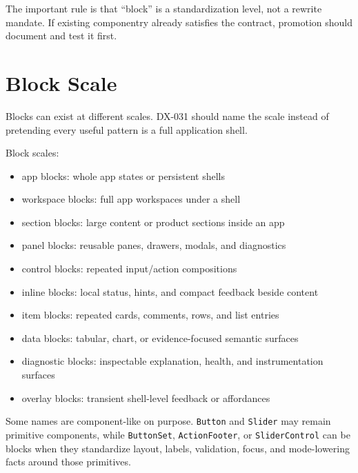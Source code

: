 The important rule is that ``block'' is a standardization level, not a rewrite mandate. If existing componentry already satisfies the contract, promotion should document and test it first.

\section{Block Scale}\label{record-128-block-scale}

Blocks can exist at different scales. DX-031 should name the scale instead of pretending every useful pattern is a full application shell.

Block scales:

\begin{itemize}
\tightlist
\item
  app blocks: whole app states or persistent shells
\item
  workspace blocks: full app workspaces under a shell
\item
  section blocks: large content or product sections inside an app
\item
  panel blocks: reusable panes, drawers, modals, and diagnostics
\item
  control blocks: repeated input/action compositions
\item
  inline blocks: local status, hints, and compact feedback beside content
\item
  item blocks: repeated cards, comments, rows, and list entries
\item
  data blocks: tabular, chart, or evidence-focused semantic surfaces
\item
  diagnostic blocks: inspectable explanation, health, and instrumentation surfaces
\item
  overlay blocks: transient shell-level feedback or affordances
\end{itemize}

Some names are component-like on purpose. \texttt{B\allowbreak{}u\allowbreak{}t\allowbreak{}t\allowbreak{}o\allowbreak{}n} and \texttt{S\allowbreak{}l\allowbreak{}i\allowbreak{}d\allowbreak{}e\allowbreak{}r} may remain primitive components, while \texttt{B\allowbreak{}u\allowbreak{}t\allowbreak{}t\allowbreak{}o\allowbreak{}n\allowbreak{}S\allowbreak{}e\allowbreak{}t}, \texttt{A\allowbreak{}c\allowbreak{}t\allowbreak{}i\allowbreak{}o\allowbreak{}n\allowbreak{}F\allowbreak{}o\allowbreak{}o\allowbreak{}t\allowbreak{}e\allowbreak{}r}, or \texttt{S\allowbreak{}l\allowbreak{}i\allowbreak{}d\allowbreak{}e\allowbreak{}r\allowbreak{}C\allowbreak{}o\allowbreak{}n\allowbreak{}t\allowbreak{}r\allowbreak{}o\allowbreak{}l} can be blocks when they standardize layout, labels, validation, focus, and mode-lowering facts around those primitives.

